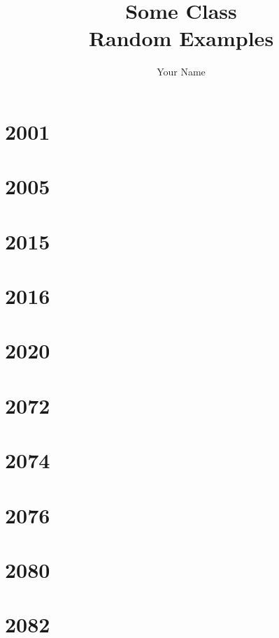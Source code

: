 \documentclass{report}
\title{\Huge{Some Class}\\Random Examples}
\author{\huge{Your Name}}
\date{}
\begin{document}
\maketitle
\newpage%
\tableofcontents
\pagebreak


\chapter{2001}

\chapter{2005}

\chapter{2015}

\chapter{2016}

\chapter{2020}


\chapter{2072}

\chapter{2074}

\chapter{2076}

\chapter{2080}

\chapter{2082}
\end{document}
